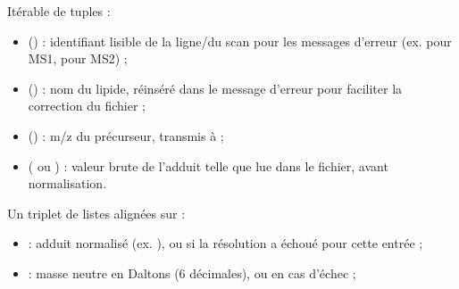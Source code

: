 \documentclass[letterpaper,10pt,english]{sphinxmanual}
\begin{document}
\begin{description}
\begin{description}
\sphinxAtStartPar
Itérable de tuples  :
\begin{itemize}
\item {} 
\sphinxAtStartPar
{} () : identifiant lisible de la ligne/du scan pour les
messages d’erreur (ex.  pour MS1,  pour MS2) ;

\item {} 
\sphinxAtStartPar
{} () : nom du lipide, ré\sphinxhyphen{}inséré dans le message
d’erreur pour faciliter la correction du fichier ;

\item {} 
\sphinxAtStartPar
{} () : m/z du précurseur, transmis à
{\hyperref[\detokenize{api:utils.neutral_mass.neutral_mass}]{}} ;

\item {} 
\sphinxAtStartPar
{} ( ou ) : valeur brute de l’adduit telle que
lue dans le fichier, avant normalisation.

\end{itemize}

\end{description}

\sphinxAtStartPar
Un triplet  de listes alignées sur
 :
\begin{itemize}
\item {} 
\sphinxAtStartPar
{} : adduit normalisé (ex. ), ou  si la
résolution a échoué pour cette entrée ;

\item {} 
\sphinxAtStartPar
{} : masse neutre en Daltons (6 décimales), ou  en cas
d’échec ;


\end{itemize}
\end{description}
\end{document}
